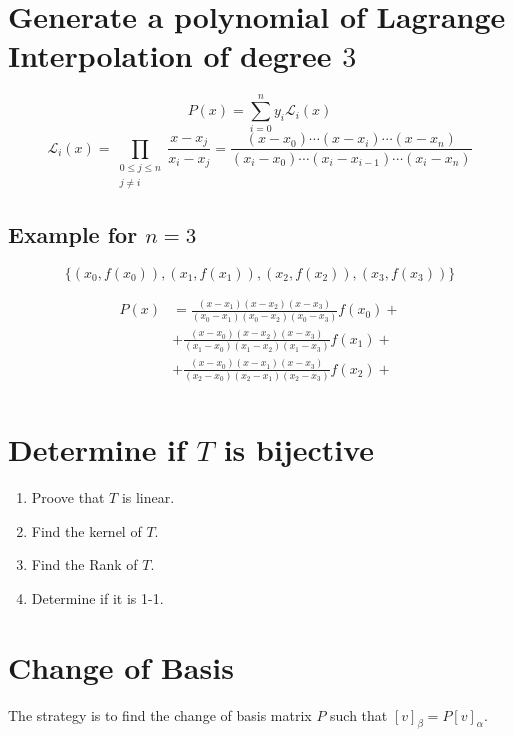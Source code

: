 \documentclass[10pt, oneside]{article}
\begin{document}
\section{Generate a polynomial of Lagrange Interpolation of degree $3$}
\[
	P(x) = \sum_{i=0}^{n} y_i \mathcal{L}_i(x)
\]
\[
	\mathcal{L}_i(x) =
	\prod_{\substack{0 \leq j \leq n \\ j \neq i}} \frac{x - x_j}{x_i - x_j} =
	\frac{(x-x_0)\cdots(x-x_i)\cdots(x-x_n)}{(x_i-x_0)\cdots(x_i-x_{i-1})\cdots(x_i-x_n)}
\]

\subsection{Example for $n = 3$}

$$ \{(x_0, f(x_0)), (x_1, f(x_1)), (x_2, f(x_2)), (x_3, f(x_3))\} $$

\[
	\begin{split}
		P(x) &= \frac{(x-x_1)(x-x_2)(x-x_3)}{(x_0-x_1)(x_0-x_2)(x_0-x_3)}f(x_0) + \\
		&+ \frac{(x-x_0)(x-x_2)(x-x_3)}{(x_1-x_0)(x_1-x_2)(x_1-x_3)}f(x_1) + \\
		&+ \frac{(x-x_0)(x-x_1)(x-x_3)}{(x_2-x_0)(x_2-x_1)(x_2-x_3)}f(x_2) + \\
	\end{split}
\]

\section{Determine if $T$ is bijective}

\begin{enumerate}
	\item Proove that $T$ is linear.
	\item Find the kernel of $T$.
	\item Find the Rank of $T$.
	\item Determine if it is 1-1.
\end{enumerate}

\section{Change of Basis}

The strategy is to find the change of basis matrix $P$ such that $[v]_{\beta} = P[v]_{\alpha}$.
\end{document}
